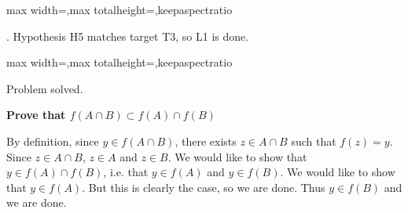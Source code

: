 \documentclass[a4paper,twoside,12pt]{article} %
\makeatletter
\DeclareRobustCommand{\_}{%
  \leavevmode\vbox{%
    \hrule\@width.4em
          \@height-.16ex
          \@depth\dimexpr.16ex+.28pt\relax}}
\newcommand\Tstrut{\rule{0pt}{2.4ex}}
\newcommand\Bstrut{\rule[-1.1ex]{0pt}{0pt}}
\newenvironment{fit}{\begin{adjustbox}{max width=\textwidth,max totalheight=\textheight,keepaspectratio}}{\end{adjustbox}}
\makeatother
\begin{document}
\begin{steps}
\begin{fit}
%
\end{fit}
\smallskip

. Hypothesis H5 matches target T3, so L1 is done.\nopagebreak[4] 
\nopagebreak[4] 
\smallskip\nopagebreak[4] 

\begin{fit}%
\end{fit}

Problem solved.
\cleardoublepage

\end{steps}
{\begin{center} \large \textbf{Prove that $f(A \cap B) \subset f(A) \cap f(B)$}\end{center}}\nopagebreak[4]

\begin{center}
\begin{minipage}{120mm}
By definition, since $y\in f(A\cap B)$, there exists $z\in A\cap B$ such that $f(z) = y$. Since $z\in A\cap B$, $z\in A$ and $z\in B$. We would like to show that $y\in f(A)\cap f(B)$, i.e. that $y\in f(A)$ and $y\in f(B)$. We would like to show that $y\in f(A)$. But this is clearly the case, so we are done. Thus $y\in f(B)$ and we are done.
\end{minipage}
\end{center}
\end{document}

